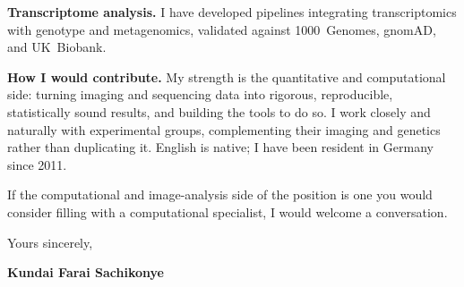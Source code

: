 \documentclass[12pt,a4paper]{article}
\begin{document}
\textbf{Transcriptome analysis.}
I have developed pipelines integrating transcriptomics with genotype and
metagenomics, validated against 1000~Genomes, gnomAD, and UK~Biobank.

\textbf{How I would contribute.}
My strength is the quantitative and computational side: turning imaging and
sequencing data into rigorous, reproducible, statistically sound results, and
building the tools to do so. I work closely and naturally with experimental
groups, complementing their imaging and genetics rather than duplicating it.
English is native; I have been resident in Germany since 2011.

If the computational and image-analysis side of the position is one you would
consider filling with a computational specialist, I would welcome a conversation.

\vspace{1.5em}
Yours sincerely,

\vspace{2.5em}
\textbf{Kundai Farai Sachikonye}
\end{document}
